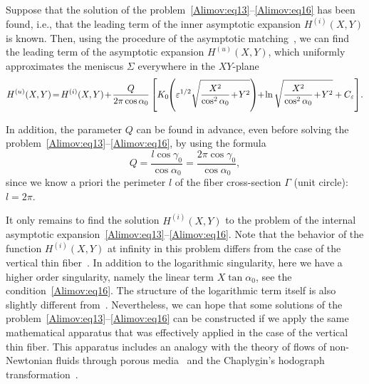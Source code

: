 \documentclass[
11pt,%
tightenlines,%
twoside,%
onecolumn,%
nofloats,%
nobibnotes,%
nofootinbib,%
superscriptaddress,%
noshowpacs,%
centertags]%
{revtex4-2}
\begin{document}
Suppose that the solution of the problem~\eqref{Alimov:eq13}--\eqref{Alimov:eq16} has been found,
i.e., that the leading term of the inner asymptotic expansion $H^{(i)}(X,Y)$ is known. Then, using
the procedure of the asymptotic matching~\cite{Alimov:bib15}, we can find the leading term of the
asymptotic expansion $H^{(u)}(X,Y)$, which uniformly approximates the meniscus $\Sigma$ everywhere
in the $XY$-plane~\cite{Alimov:bib9}
\begin{equation}
\label{Alimov:eq18} H^{(u)}(X,Y)\hspace{-0.5mm} =\hspace{-0.5mm}
H^{(i)}(X,Y)\hspace{-0.5mm}+\hspace{-0.5mm}\frac{Q}{2\pi \cos \alpha_0 }\left[ {K_0\hspace{-1mm}
\left( {\varepsilon^{1/2} \sqrt {\frac{X^2}{\cos^2\alpha_0 }\hspace{-0.5mm}+\hspace{-0.5mm}Y^2} }
\right)\hspace{-1mm}+\hspace{-0.5mm}\ln \sqrt {\frac{X^2}{\cos^2\alpha_0
}\hspace{-0.5mm}+\hspace{-0.5mm}Y^2}+C_\varepsilon } \right]\hspace{-0.5mm}.
\end{equation}

In addition, the parameter $Q$ can be found in advance, even before solving the
problem~\eqref{Alimov:eq13}--\eqref{Alimov:eq16}, by using the formula~\cite{Alimov:bib9}
\begin{equation}
\label{Alimov:eq19} Q = \frac{l\cos \gamma_0 }{\cos \alpha_0 } = \frac{2\pi \cos \gamma_0 }{\cos
\alpha_0 },
\end{equation}
since we know a priori the perimeter $l$ of the fiber cross-section $\Gamma$ (unit
circle): $l = 2\pi$.

It only remains to find the solution $H^{(i)}(X,Y)$ to the problem of the internal asymptotic
expansion~\eqref{Alimov:eq13}--\eqref{Alimov:eq16}. Note that the behavior of the function
$H^{(i)}(X,Y)$ at infinity in this problem differs from the case of the vertical thin
fiber~\cite{Alimov:bib5}. In addition to the logarithmic singularity, here we have a higher order
singularity, namely the linear term $X \tan \alpha_0 $, see the condition~\eqref{Alimov:eq16}. The
structure of the logarithmic term itself is also slightly different from~\cite{Alimov:bib5}.
Nevertheless, we can hope that some solutions of the
problem~\eqref{Alimov:eq13}--\eqref{Alimov:eq16} can be constructed if we apply the same
mathematical apparatus that was effectively applied in the case of the vertical thin fiber. This
apparatus includes an analogy with the theory of flows of non-Newtonian fluids through porous
media~\cite{Alimov:bib16} and the Chaplygin's hodograph transformation~\cite{Alimov:bib17}.
\end{document}
